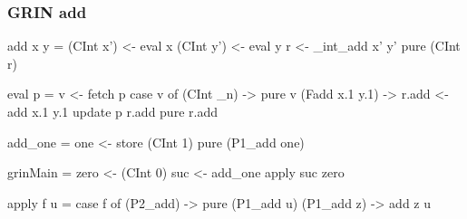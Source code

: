 \documentclass[bigger]{beamer}
\begin{document}
\begin{frame}[fragile]
\frametitle{GRIN add}

\begin{center}

	\begin{minipage}{0.45\textwidth}
		\begin{haskellcode}
			add x y =
			 (CInt x') <- eval x
			 (CInt y') <- eval y
			 r <- _int_add x' y'
			 pure (CInt r)
		\end{haskellcode}
		\pause
		\begin{haskellcode}
			eval p =
			 v <- fetch p
			 case v of
			  (CInt _n) -> pure v
			  (Fadd x.1 y.1) ->
			   r.add <- add x.1 y.1
			   update p r.add
			   pure r.add
		\end{haskellcode}
	\end{minipage}
	\hfill
	\pause
	\begin{minipage}{0.50\textwidth}
		\begin{haskellcode}
			add_one =
			 one <- store (CInt 1)
			 pure (P1_add one)
		\end{haskellcode}
		\pause
		\begin{haskellcode}
			grinMain =
			 zero <- (CInt 0)
			 suc <- add_one
			 apply suc zero
		\end{haskellcode}
		\vfill
		\pause
		\begin{haskellcode}
			apply f u =
			 case f of
			  (P2_add) ->
			   pure (P1_add u)
			  (P1_add z) -> add z u
		\end{haskellcode}
	\end{minipage}

\end{center}
\end{frame}
\end{document}
